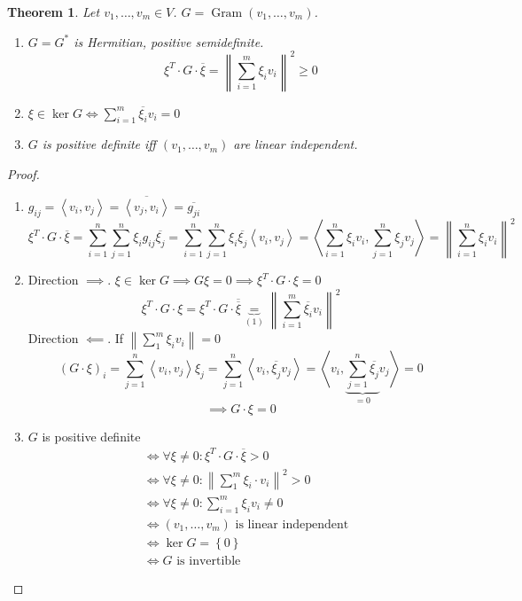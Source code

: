 \documentclass[a4paper]{article}
\newcounter{lecref}[section]
\numberwithin{lecref}{section}
\newtheorem{theorem}[lecref]{Theorem}
\newcommand{\set}[1]{\left\{#1\right\}}
\newcommand{\ip}[2]{\left\langle#1,#2\right\rangle} %
\newcommand{\norm}[1]{\left\|#1\right\|}
\begin{document}
\begin{theorem} %
  Let $v_1, \ldots, v_m \in V$. $G = \operatorname{Gram}(v_1, \ldots, v_m)$.
  \begin{enumerate}
    \item $G = G^*$ is Hermitian, positive \emph{semi}definite.
      \[ \xi^T \cdot G \cdot \overline{\xi} = \norm{\sum_{i=1}^m \xi_i v_i}^2 \geq 0 \]
    \item $\xi \in \ker{G} \iff \sum_{i=1}^m \overline{\xi_i} v_i = 0$
    \item $G$ is positive definite iff $(v_1, \ldots, v_m)$ are linear independent.
  \end{enumerate}
\end{theorem}

\begin{proof}
  \begin{enumerate}
    \item $g_{ij} = \ip{v_i}{v_j} = \overline{\ip{v_j}{v_i}} = \overline{g_{ji}}$
      \[ \xi^T \cdot G \cdot \overline{\xi} = \sum_{i=1}^n \sum_{j=1}^n \xi_i g_{ij} \overline{\xi_j} = \sum_{i=1}^n \sum_{j=1}^n \xi_i \overline{\xi_j} \ip{v_i}{v_j} = \ip{\sum_{i=1}^n \xi_i v_i}{\sum_{j=1}^n \xi_j v_j} = \norm{\sum_{i=1}^n \xi_i v_i}^2 \]
    \item
      Direction $\implies$.
      $\xi \in \ker{G} \implies G \xi = 0 \implies \xi^T \cdot G \cdot \xi = 0$
      \[ \xi^T \cdot G \cdot \xi = \xi^T \cdot G \cdot \overline{\overline{\xi}} \underbrace{=}_{(1)} \norm{\sum_{i=1}^m \overline{\xi_i} v_i}^2 \]
      Direction $\impliedby$. If $\norm{\sum_1^m \xi_i v_i} = 0$
      \[ (G \cdot \xi)_i = \sum_{j=1}^n \ip{v_i}{v_j} \xi_j = \sum_{j=1}^n \ip{v_i}{\overline{\xi_j} v_j} = \ip{v_i}{\underbrace{\sum_{j=1}^n \overline{\xi_j}}_{=0} v_j} = 0 \]
      \[ \implies G \cdot \xi = 0 \]
    \item $G$ is positive definite
      \begin{align*}
        &\iff \forall \xi \neq 0: \xi^T \cdot G \cdot \overline \xi > 0 \\
        &\iff \forall \xi \neq 0: \norm{\sum_1^m \xi_i \cdot v_i}^2 > 0 \\
        &\iff \forall \xi \neq 0: \sum_{i=1}^m \xi_i v_i \neq 0 \\
        &\iff (v_1, \ldots, v_m) \text{ is linear independent} \\
        &\iff \ker{G} = \set{0} \\
        &\iff G \text{ is invertible}
      \end{align*}
  \end{enumerate}
\end{proof}
\end{document}

